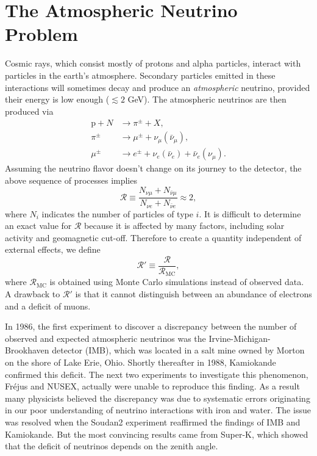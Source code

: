 \section{The Atmospheric Neutrino Problem}
Cosmic rays, which consist mostly of protons and alpha particles, interact with
particles in the earth's atmosphere. Secondary particles emitted in these
interactions will sometimes decay and produce an {\it atmospheric} neutrino,
provided their energy is low enough ($\lesssim2$ GeV). The atmospheric neutrinos
are then produced via
\begin{equation}
  \begin{aligned}
    \text{p}+N&\to\pi^\pm+X, \\
    \pi^\pm&\to\mu^\pm+\nu_\mu(\bar{\nu}_\mu), \\
    \mu^\pm&\to e^\pm+\nu_e(\bar{\nu}_e)+\bar{\nu}_e(\nu_\mu).
  \end{aligned}
\end{equation}
Assuming the neutrino flavor doesn't change on its journey to the detector,
the above sequence of processes implies
\begin{equation}
  \mathcal{R}\equiv\frac{N_{\nu\mu}+N_{\bar{\nu}\mu}}
                           {N_{\nu e}+N_{\bar{\nu}e}}\approx2,
\end{equation}
where $N_i$ indicates the number of particles of type $i$.
It is difficult to determine an exact value for $\mathcal{R}$ because it is
affected by many factors, including solar activity and geomagnetic cut-off.
Therefore to create a quantity independent of external effects, we define
\begin{equation}
  \mathcal{R}'\equiv\frac{\mathcal{R}}{\mathcal{R}_\text{MC}},
\end{equation}
where $\mathcal{R}_\text{MC}$ is obtained using Monte Carlo simulations instead
of observed data. A drawback to $\mathcal{R}'$ is that it cannot distinguish
between an abundance of electrons and a deficit of muons.

In 1986, the first experiment to discover a discrepancy between the number of
observed and expected atmospheric neutrinos was the Irvine-Michigan-Brookhaven
detector (IMB), which was located in a salt mine owned by Morton on 
the shore of Lake
Erie, Ohio.  Shortly thereafter in 1988, Kamiokande confirmed this deficit.
The next two experiments to investigate this phenomenon, Fr\'ejus and NUSEX,
actually were unable to reproduce this finding. As a result many physicists
believed the discrepancy was due to systematic errors originating in our poor
understanding of neutrino interactions with iron and water. The issue was
resolved when the Soudan2 experiment reaffirmed the findings of IMB and
Kamiokande. But the most convincing results came from Super-K, which showed
that the deficit of neutrinos depends on the zenith angle.

